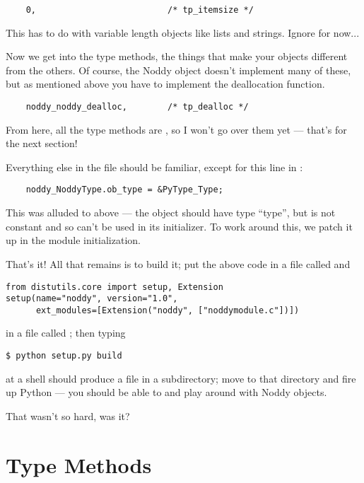 \begin{verbatim}
    0,                          /* tp_itemsize */
\end{verbatim}

This has to do with variable length objects like lists and strings.
Ignore for now...

Now we get into the type methods, the things that make your objects
different from the others.  Of course, the Noddy object doesn't
implement many of these, but as mentioned above you have to implement
the deallocation function.

\begin{verbatim}
    noddy_noddy_dealloc,        /* tp_dealloc */
\end{verbatim}

From here, all the type methods are \NULL, so I won't go over them yet
--- that's for the next section!

Everything else in the file should be familiar, except for this line
in :

\begin{verbatim}
    noddy_NoddyType.ob_type = &PyType_Type;
\end{verbatim}

This was alluded to above --- the  object should
have type ``type'', but  is not constant and so
can't be used in its initializer.  To work around this, we patch it up
in the module initialization.

That's it!  All that remains is to build it; put the above code in a
file called  and

\begin{verbatim}
from distutils.core import setup, Extension
setup(name="noddy", version="1.0",
      ext_modules=[Extension("noddy", ["noddymodule.c"])])
\end{verbatim}

in a file called ; then typing

\begin{verbatim}
$ python setup.py build
\end{verbatim} %

at a shell should produce a file  in a subdirectory;
move to that directory and fire up Python --- you should be able to
 and play around with Noddy objects.

That wasn't so hard, was it?


\section{Type Methods
         \label{dnt-type-methods}}

